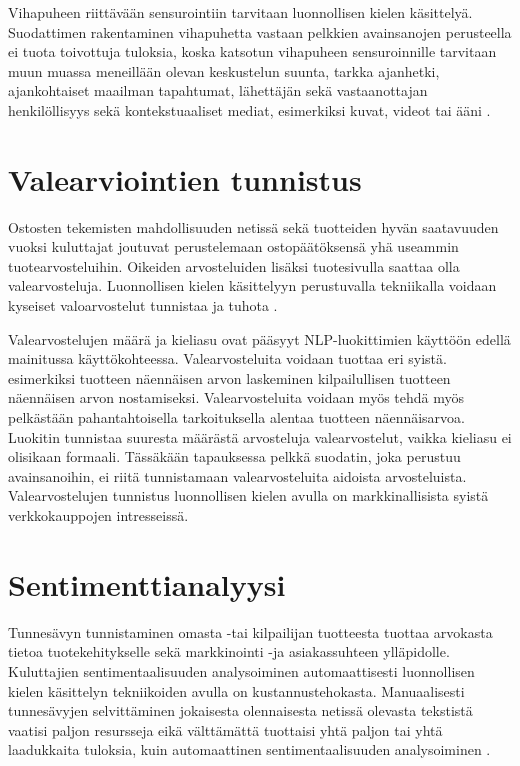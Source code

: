 Vihapuheen riittävään sensurointiin tarvitaan luonnollisen kielen käsittelyä. Suodattimen rakentaminen vihapuhetta vastaan pelkkien avainsanojen perusteella ei tuota toivottuja tuloksia, koska katsotun vihapuheen sensuroinnille tarvitaan muun muassa meneillään olevan keskustelun suunta, tarkka ajanhetki, ajankohtaiset maailman tapahtumat, lähettäjän sekä vastaanottajan henkilöllisyys sekä kontekstuaaliset mediat, esimerkiksi kuvat, videot tai ääni \citep{hate}.

\section{Valearviointien tunnistus}
Ostosten tekemisten mahdollisuuden netissä sekä tuotteiden hyvän saatavuuden vuoksi kuluttajat joutuvat perustelemaan ostopäätöksensä yhä useammin tuotearvosteluihin. Oikeiden arvosteluiden lisäksi tuotesivulla saattaa olla valearvosteluja. Luonnollisen kielen käsittelyyn perustuvalla tekniikalla voidaan kyseiset valoarvostelut tunnistaa ja tuhota \citep{falsereview}.

Valearvostelujen määrä ja kieliasu ovat pääsyyt NLP-luokittimien käyttöön edellä mainitussa käyttökohteessa. Valearvosteluita voidaan tuottaa eri syistä. esimerkiksi tuotteen näennäisen arvon laskeminen kilpailullisen tuotteen näennäisen arvon nostamiseksi.  Valearvosteluita voidaan myös tehdä myös pelkästään pahantahtoisella tarkoituksella alentaa tuotteen näennäisarvoa. Luokitin tunnistaa suuresta määrästä arvosteluja valearvostelut, vaikka kieliasu ei olisikaan formaali. Tässäkään tapauksessa pelkkä suodatin, joka perustuu avainsanoihin, ei riitä tunnistamaan valearvosteluita aidoista arvosteluista. Valearvostelujen tunnistus luonnollisen kielen avulla on markkinallisista syistä verkkokauppojen intresseissä.

\section{Sentimenttianalyysi}

Tunnesävyn tunnistaminen omasta -tai kilpailijan tuotteesta tuottaa arvokasta tietoa tuotekehitykselle sekä markkinointi -ja asiakassuhteen ylläpidolle. Kuluttajien sentimentaalisuuden analysoiminen automaattisesti luonnollisen kielen käsittelyn tekniikoiden avulla on kustannustehokasta. Manuaalisesti tunnesävyjen selvittäminen jokaisesta olennaisesta netissä olevasta tekstistä vaatisi paljon resursseja eikä välttämättä tuottaisi yhtä paljon tai yhtä laadukkaita tuloksia, kuin automaattinen sentimentaalisuuden analysoiminen \citep{sentimentality}.


